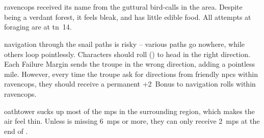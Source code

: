 \section{}
\label{ravencops}

\Gls{ravencops} received its name from the guttural bird-calls in the area.
Despite being a verdant forest, it feels bleak, and has little edible food.
All attempts at \gls{foraging} are at \gls{tn}~14.

\Gls{navigation} through the snail paths is risky -- various paths go nowhere, while others loop pointlessly.
Characters should roll  (\tn[10]) to head in the right direction.
Each Failure Margin sends the troupe in the wrong direction, adding a pointless mile.
However, every time the troupe ask for directions from friendly \glspl{npc} within \gls{ravencops}, they should receive a permanent +2~Bonus to \gls{navigation} rolls within \gls{ravencops}.

\Gls{oathtower} sucks up most of the \glspl{mp} in the surrounding \gls{region}, which makes the air feel thin.
Unless  is missing 6~\glspl{mp} or more, they can only receive 2~\glspl{mp} at the end of .%




